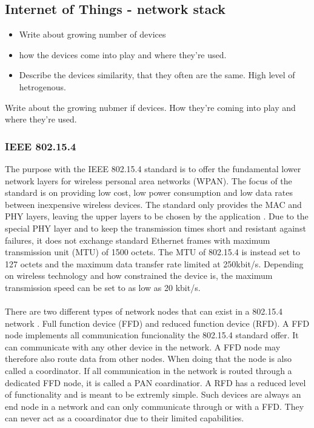 \subsection{Internet of Things - network stack}

\begin{itemize}
	\item Write about growing number of devices
	\item how the devices come into play and where they're used.
	\item Describe the devices similarity, that they often are the same. High level of hetrogenous.
\end{itemize}


Write about the growing nubmer if devices. How they're coming into play and where they're used.

\subsubsection{IEEE 802.15.4}
The purpose with the IEEE 802.15.4 standard is to offer the fundamental lower network layers for wireless personal area networks (WPAN). The focus of the standard is on providing low cost, low power consumption and low data rates between inexpensive wireless devices. 
The standard only provides the MAC and PHY layers, leaving the upper layers to be chosen by the application \cite{6185525} \cite{radio-electronic-802-15-4}. Due to the special PHY layer and to keep the transmission times short and resistant against failures, it does not exchange standard Ethernet frames with maximum transmission unit (MTU) of 1500 octets. The MTU of 802.15.4 is instead set to 127 octets and the maximum data transfer rate limited at 250kbit/s. Depending on wireless technology and how constrained the device is, the maximum transmission speed can be set to as low as 20 kbit/s.
\\\\
There are two different types of network nodes that can exist in a 802.15.4 network \cite{radio-electronic-802-15-4}. Full function device (FFD) and reduced function device (RFD). A FFD node implements all communication funcionality the 802.15.4 standard offer. It can communicate with any other device in the network. A FFD node may therefore also route data from other nodes. When doing that the node is also called a coordinator. If all communication in the network is routed through a dedicated FFD node, it is called a PAN coardinatior. A RFD has a reduced level of functionality and is meant to be extremly simple. Such devices are always an end node in a network and can only communicate through or with a FFD. They can never act as a cooardinator due to their limited capabilities.

